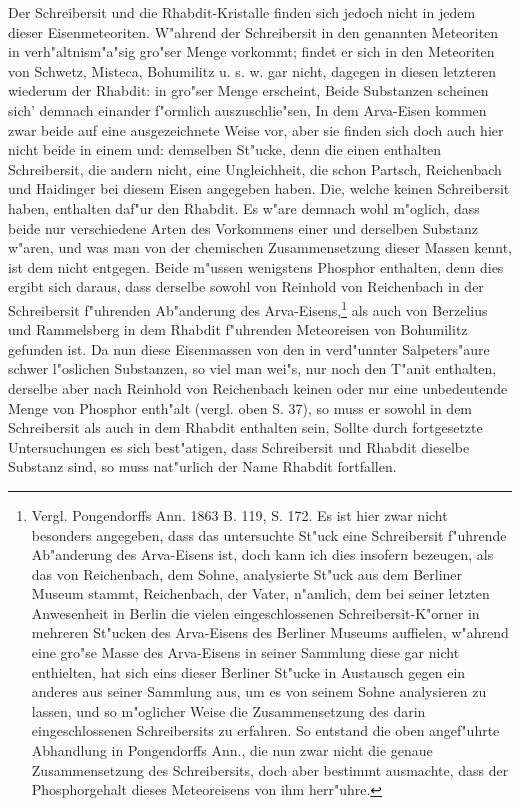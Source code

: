 \documentclass[a4paper, 11pt, oneside, german]{article}
\begin{document}
Der Schreibersit und die Rhabdit-Kristalle finden sich jedoch nicht in jedem dieser Eisenmeteoriten. W"ahrend der Schreibersit in den genannten Meteoriten in verh"altnism"a"sig gro"ser Menge vorkommt; findet er sich in den Meteoriten von Schwetz, Misteca, Bohumilitz u. s. w. gar nicht, dagegen in diesen letzteren wiederum der Rhabdit: in gro"ser Menge erscheint, Beide Substanzen scheinen sich’ demnach einander f"ormlich auszuschlie"sen, In dem Arva-Eisen kommen zwar beide auf eine ausgezeichnete Weise vor, aber sie finden sich doch auch hier nicht beide in einem und: demselben St"ucke, denn die einen enthalten Schreibersit, die andern nicht, eine Ungleichheit, die schon Partsch, Reichenbach und Haidinger bei diesem Eisen angegeben haben. Die, welche keinen Schreibersit haben, enthalten daf"ur den Rhabdit. Es w"are demnach wohl m"oglich, dass beide nur verschiedene Arten des Vorkommens einer und derselben Substanz w"aren, und was man von der chemischen Zusammensetzung dieser Massen kennt, ist dem nicht entgegen. Beide m"ussen wenigstens Phosphor enthalten, denn dies ergibt sich daraus, dass derselbe sowohl von Reinhold von Reichenbach in der Schreibersit f"uhrenden Ab"anderung des Arva-Eisens,\footnote{Vergl. Pongendorffs Ann. 1863 B. 119, S. 172. Es ist hier zwar nicht besonders angegeben, dass das untersuchte St"uck eine Schreibersit f"uhrende Ab"anderung des Arva-Eisens ist, doch kann ich dies insofern bezeugen, als das von Reichenbach, dem Sohne, analysierte St"uck aus dem Berliner Museum stammt, Reichenbach, der Vater, n"amlich, dem bei seiner letzten Anwesenheit in Berlin die vielen eingeschlossenen Schreibersit-K"orner in mehreren St"ucken des Arva-Eisens des Berliner Museums auffielen, w"ahrend eine gro"se Masse des Arva-Eisens in seiner Sammlung diese gar nicht enthielten, hat sich eins dieser Berliner St"ucke in Austausch gegen ein anderes aus seiner Sammlung aus, um es von seinem Sohne analysieren zu lassen, und so m"oglicher Weise die Zusammensetzung des darin eingeschlossenen Schreibersits zu erfahren. So entstand die oben angef"uhrte Abhandlung in Pongendorffs Ann., die nun zwar nicht die genaue Zusammensetzung des Schreibersits, doch aber bestimmt ausmachte, dass der Phosphorgehalt dieses Meteoreisens von ihm herr"uhre.} als auch von Berzelius und Rammelsberg in dem Rhabdit f"uhrenden Meteoreisen von Bohumilitz gefunden ist. Da nun diese Eisenmassen von den in verd"unnter Salpeters"aure schwer l"oslichen Substanzen, so viel man wei"s, nur noch den T"anit enthalten, derselbe aber nach Reinhold von Reichenbach keinen oder nur eine unbedeutende Menge von Phosphor enth"alt (vergl. oben S. 37), so muss er sowohl in dem Schreibersit als auch in dem Rhabdit enthalten sein, Sollte durch fortgesetzte Untersuchungen es sich best"atigen, dass Schreibersit und Rhabdit dieselbe Substanz sind‚ so muss nat"urlich der Name Rhabdit fortfallen.
\end{document}
